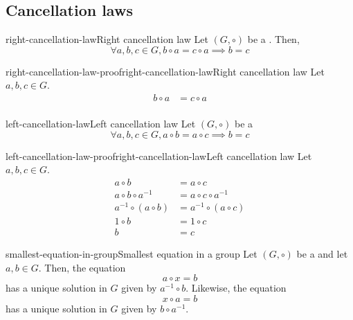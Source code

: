 \documentclass[preview]{standalone}
\begin{document}
\subsection{Cancellation laws}

\begin{snippettheorem}{right-cancellation-law}{Right cancellation law}
    Let \((G, \circ)\) be a \group. Then,
    \[
        \forall a,b,c \in G, b \circ a = c \circ a \implies b = c
    \]
\end{snippettheorem}

\begin{snippetproof}{right-cancellation-law-proof}{right-cancellation-law}{Right cancellation law}
    Let \(a,b,c \in G\).
    \begin{align*}
        b \circ a &= c \circ a \\
    \end{align*}
    \todo
\end{snippetproof}

\begin{snippettheorem}{left-cancellation-law}{Left cancellation law}
    Let \((G, \circ)\) be a \group
    \[
        \forall a,b,c \in G, a \circ b = a \circ c \implies b = c
    \]
\end{snippettheorem}

\begin{snippetproof}{left-cancellation-law-proof}{right-cancellation-law}{Left cancellation law}
    Let \(a,b,c \in G\).
    \begin{align*}
        a \circ b &= a \circ c \\
        a \circ b \circ a^{-1} &= a \circ c \circ a^{-1} \\
        a^{-1} \circ (a \circ b) &= a^{-1} \circ (a \circ c) \\
        1 \circ b &= 1 \circ c \\
        b &= c
    \end{align*}
\end{snippetproof}

\begin{snippetproposition}{smallest-equation-in-group}{Smallest equation in a group}
    Let \((G, \circ)\) be a \group and let \(a,b \in G\).
    Then, the equation
    \[
        a \circ x = b
    \]
    has a unique solution in \(G\) given by \(a^{-1} \circ b\).
    Likewise, the equation
    \[
        x \circ a = b
    \]
    has a unique solution in \(G\) given by \(b \circ a^{-1}\).
\end{snippetproposition}
\end{document}
